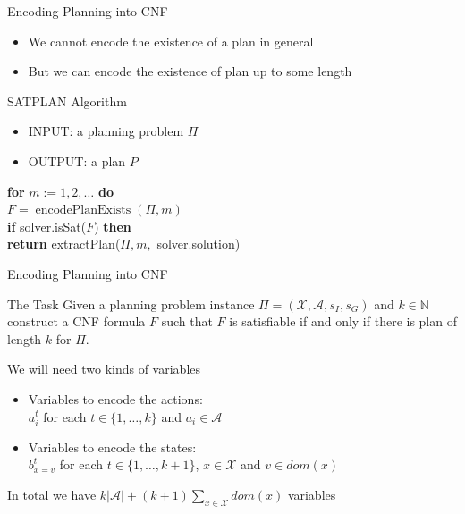 \documentclass[t]{sdqbeamer}
\begin{document}
\begin{frame}{Encoding Planning into CNF}
\begin{itemize}
	\item We cannot encode the existence of a plan in general
	\item But we can encode the existence of plan up to some length
\end{itemize}
\pause
\begin{block}{SATPLAN Algorithm}
\begin{itemize}
	\item INPUT: a planning problem $\Pi$
	\item OUTPUT: a plan $P$
\end{itemize}
\textbf{for} $m:=1,2,\dots$ \textbf{do}\\
\hspace{1em} $F = \operatorname{encodePlanExists}(\Pi,m)$\\
\hspace{1em} \textbf{if} solver.isSat($F$) \textbf{then}\\
\hspace{1em}\hspace{1em}\textbf{return} extractPlan($\Pi,m,$ solver.solution)\\
\end{block}
\end{frame}


\begin{frame}{Encoding Planning into CNF}
\begin{block}{The Task}
Given a planning problem instance $\Pi = (\mathcal{X}, \mathcal{A}, s_I, s_G)$ and $k\in \mathbb{N}$
construct a CNF formula $F$ such that $F$ is satisfiable if and only if there is plan of length $k$
for $\Pi$.
\end{block}
\pause
We will need two kinds of variables
\begin{itemize}
	\item Variables to encode the actions:\\
	$a_i^t$ for each $t \in \{1,\dots,k\}$ and $a_i \in \mathcal{A}$
	\item Variables to encode the states:\\
	$b_{x=v}^t$ for each $t \in \{1,\dots,k+1\}$, $x \in \mathcal{X}$ and $v \in dom(x)$
\end{itemize}
\vspace{1em}
In total we have $k|\mathcal{A}| + (k+1)\sum_{x \in \mathcal{X}} dom(x)$ variables
\end{frame}
\end{document}
